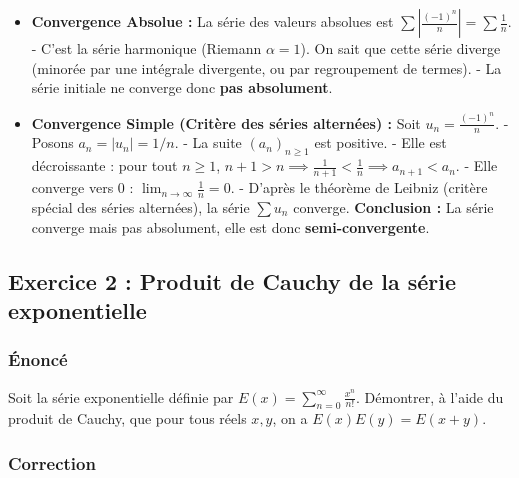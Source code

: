\documentclass[12pt,a4paper]{report}
\begin{document}
\begin{itemize}
\item \textbf{Convergence Absolue :} La série des valeurs absolues est $\sum |\frac{(-1)^n}{n}| = \sum \frac{1}{n}$.
   - C'est la série harmonique (Riemann $\alpha=1$). On sait que cette série diverge (minorée par une intégrale divergente, ou par regroupement de termes).
   - La série initiale ne converge donc \textbf{pas absolument}.
\item \textbf{Convergence Simple (Critère des séries alternées) :} Soit $u_n = \frac{(-1)^n}{n}$.
   - Posons $a_n = |u_n| = 1/n$.
   - La suite $(a_n)_{n\ge 1}$ est positive.
   - Elle est décroissante : pour tout $n \ge 1$, $n+1 > n \implies \frac{1}{n+1} < \frac{1}{n} \implies a_{n+1} < a_n$.
   - Elle converge vers 0 : $\lim_{n\to\infty} \frac{1}{n} = 0$.
   - D'après le théorème de Leibniz (critère spécial des séries alternées), la série $\sum u_n$ converge.
\textbf{Conclusion :} La série converge mais pas absolument, elle est donc \textbf{semi-convergente}.
\end{itemize}


\subsection{Exercice 2 : Produit de Cauchy de la série exponentielle}

\subsubsection{Énoncé}
Soit la série exponentielle définie par $E(x) = \sum_{n=0}^\infty \frac{x^n}{n!}$. Démontrer, à l'aide du produit de Cauchy, que pour tous réels $x, y$, on a $E(x)E(y) = E(x+y)$.

\subsubsection{Correction}
\end{document}

